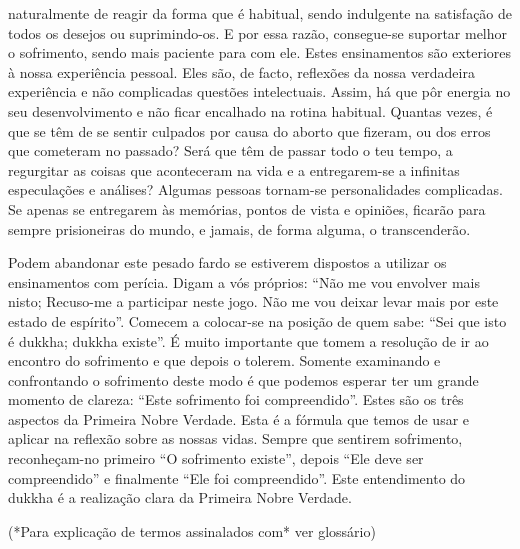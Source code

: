 naturalmente de reagir da forma que é habitual, sendo indulgente na satisfação de todos os desejos ou suprimindo-os. E
por essa razão, consegue-se suportar melhor o sofrimento,
sendo mais paciente para com ele.
Estes ensinamentos são exteriores à nossa experiência
pessoal. Eles são, de facto, reflexões da nossa verdadeira
experiência e não complicadas questões intelectuais. Assim,
há que pôr energia no seu desenvolvimento e não ficar
encalhado na rotina habitual. Quantas vezes, é que se têm de
se sentir culpados por causa do aborto que fizeram, ou dos
erros que cometeram no passado? Será que têm de passar
todo o teu tempo, a regurgitar as coisas que aconteceram na
vida e a entregarem-se a infinitas especulações e análises?
Algumas pessoas tornam-se personalidades complicadas. Se
apenas se entregarem às memórias, pontos de vista e opiniões, ficarão para sempre prisioneiras do mundo, e jamais,
de forma alguma, o transcenderão.

Podem abandonar este pesado fardo se estiverem dispostos a utilizar os ensinamentos com perícia. Digam a vós
próprios: “Não me vou envolver mais nisto; Recuso-me a participar neste jogo. Não me vou deixar levar mais por este estado de espírito”. Comecem a colocar-se na posição de quem
sabe: “Sei que isto é dukkha; dukkha existe”. É muito importante que tomem a resolução de ir ao encontro do sofrimento
e que depois o tolerem. Somente examinando e confrontando
o sofrimento deste modo é que podemos esperar ter um
grande momento de clareza: “Este sofrimento foi compreendido”.
Estes são os três aspectos da Primeira Nobre Verdade.
Esta é a fórmula que temos de usar e aplicar na reflexão sobre
as nossas vidas. Sempre que sentirem sofrimento, reconheçam-no primeiro “O sofrimento existe”, depois “Ele deve
ser compreendido” e finalmente “Ele foi compreendido”.
Este entendimento do dukkha é a realização clara da Primeira
Nobre Verdade.

(*Para explicação de termos assinalados com* ver glossário)
